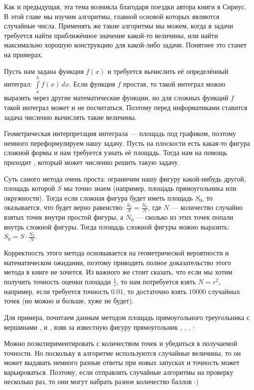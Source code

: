 Как и предыдущая, эта тема возникла благодаря поездки автора книги в Сириус. В этой главе мы изучим алгоритмы, главной основой которых являются случайные числа. Применять же такие алгоритмы мы можем, когда в задачи требуется найти приближённое значение какой-то величины, или найти максимально хорошую конструкцию для какой-либо задачи. Понятнее это станет на примерах.


Пусть нам задана функция $f(x)$ и требуется вычислить её определённый интеграл: $\int\limits_{a}^{b}f(x)\,dx$. Если функция $f$ простая, то такой интеграл можно выразить через другие математические функции, но для сложных функций $f$ такой интеграл может и не посчитаться. Поэтому перед информатиками ставится задача численно вычислять такие величины.

Геометрическая интерпретация интеграла — площадь под графиком, поэтому немного переформулируем нашу задачу. Пусть на плоскости есть какая-то фигура сложной формы и нам требуется узнать её площадь. Тогда нам на помощь приходит , который может численно решить такую задачу.

Суть самого метода очень проста: ограничим нашу фигуру какой-нибудь другой, площадь которой $S$ мы точно знаем (например, площадь прямоугольника или окружности). Тогда если сложная фигура будет иметь площадь $S_0$, то оказывается, что будет верно равенство: $\frac{S_0}{S} = \frac{N_0}{N}$, где $N$ — количество случайно взятых точек внутри простой фигуры, а $N_0$ — сколько из этих точек попали внутрь сложной фигуры. Тогда площадь сложной фигуры можно выразить: $S_0 = S \cdot \frac{N_0}{N}$.

Корректность этого метода основывается на геометрической вероятности и математическом ожидании, поэтому приводить полное доказательство этого метода в книге не хочется. Из важного же стоит сказать, что если мы хотим получить точность оценки площади $\frac{1}{r}$, то нам потребуется взять $N = r^2$, например, если требуется точность $0.01$, то достаточно взять $10000$ случайных точек (но можно и больше, хуже не будет).

Для примера, почитаем данным методом площадь прямоугольного треугольника с вершинами ,  и , взяв за известную фигуру прямоугольник , , , :


Можно поэкспериментировать с количеством точек и убедиться в получаемой точности. Но поскольку в алгоритме используются случайные величины, то он может выдавать немного разные ответы при новых запусках и точность может варьироваться. Поэтому, если отправлять случайные алгоритмы на проверку несколько раз, то они могут набрать разное количество баллов :)


